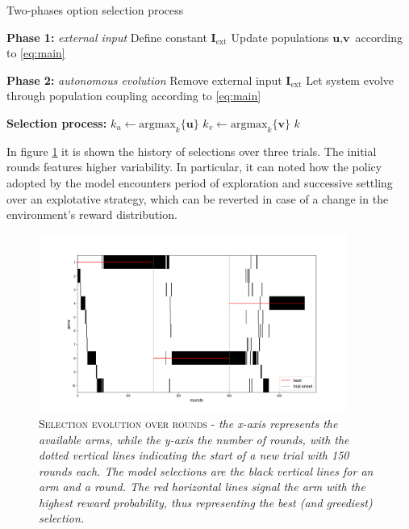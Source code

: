 \begin{algorithm}[ht]
\caption{Two-phases option selection process}
\label{alg:decision}
\SetAlgoLined
{}


\textbf{Phase 1:} \textit{external input} 
Define constant $\textbf{I}_{\text{ext}}$\;
Update populations $\textbf{u}, \textbf{v}$ according to \ref{eq:main}\;

\textbf{Phase 2:} \textit{autonomous evolution} 
Remove external input $\textbf{I}_{\text{ext}}$\;
Let system evolve through population coupling according to \ref{eq:main}\;

\textbf{Selection process:}\;
$k_{u} \gets \text{argmax}_{k}\{\textbf{u}\}$\;
$k_{v} \gets \text{argmax}_{k}\{\textbf{v}\}$\;
\Return $k$
\end{algorithm}\label{alg:decision1}

\noindent In figure \ref{fig:sel1} it is shown the history of selections over three trials. The initial rounds features higher variability. In particular, it can noted how the policy adopted by the model encounters period of exploration and successive settling over an explotative strategy, which can be reverted in case of a change in the environment's reward distribution.

\begin{figure}[ht]
    \centering
    \includegraphics[width=0.9\textwidth]{figures/selections_1.png}
    \caption{\textsc{Selection evolution over rounds} - \textit{the x-axis represents the available arms, while the y-axis the number of rounds, with the dotted vertical lines indicating the start of a new trial with 150 rounds each.
The model selections are the black vertical lines for an arm and a round. The red horizontal lines signal the arm with the highest reward probability, thus representing the best (and greediest) selection.}}
    \label{fig:sel1}
\end{figure}


